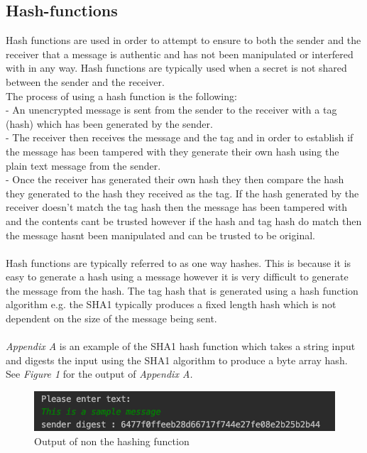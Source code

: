 \documentclass[a4paper, twoside, 11pt]{article}
\begin{document}
\subsection{Hash-functions}
Hash functions are used in order to attempt to ensure to both the sender and the receiver that a message is authentic and has not been manipulated or interfered with in any way. Hash functions are typically used when a secret is not shared between the sender and the receiver. 
\\
The process of using a hash function is the following:\\
- An unencrypted message is sent from the sender to the receiver with a tag (hash) which has been generated by the sender.\\
- The receiver then receives the message and the tag and in order to establish if the message has been tampered with they generate their own hash using the plain text message from the sender.\\
- Once the receiver has generated their own hash they then compare the hash they generated to the hash they received as the tag. If the hash generated by the receiver doesn't match the tag hash then the message has been tampered with and the contents cant be trusted however if the hash and tag hash do match then the message hasnt been manipulated and can be trusted to be original.\\
\\
Hash functions are typically referred to as one way hashes. This is because it is easy to generate a hash using a message however it is very difficult to generate the message from the hash. The tag hash that is generated using a hash function algorithm e.g. the SHA1 typically produces a fixed length hash which is not dependent on the size of the message being sent.\\
\\
\textit{Appendix A} is an example of the SHA1 hash function which takes a string input and digests the input using the SHA1 algorithm to produce a byte array hash. See \textit{Figure 1} for the output of \textit{Appendix A.} 
\\
\begin{figure}[H]
	\centering
	\includegraphics[scale=0.5]{Images/digestOutput.png}
  \caption{Output of non the hashing function}
\end{figure}
\end{document}
